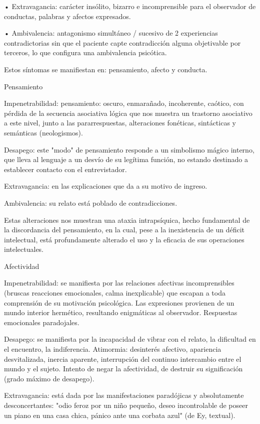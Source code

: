 \documentclass{scrbook}
\begin{document}
• Extravagancia: carácter insólito, bizarro e incomprensible para el observador de conductas, palabras y afectos expresados.

• Ambivalencia: antagonismo simultáneo / sucesivo de 2 experiencias contradictorias sin que el paciente capte contradicción alguna objetivable por terceros, lo que configura una ambivalencia psicótica.

Estos síntomas se manifiestan en: pensamiento, afecto y conducta.

Pensamiento

Impenetrabilidad: pensamiento: oscuro, enmarañado, incoherente, caótico, con pérdida de la secuencia asociativa lógica que nos muestra un trastorno asociativo a este nivel, junto a las pararrespuestas, alteraciones fonéticas, sintácticas y semánticas (neologismos).

Desapego: este "modo" de pensamiento responde a un simbolismo mágico interno, que lleva al lenguaje a un desvío de su legítima función, no estando destinado a establecer contacto con el entrevistador.

Extravagancia: en las explicaciones que da a su motivo de ingreso.

Ambivalencia: su relato está poblado de contradicciones.

Estas alteraciones nos muestran una ataxia intrapsíquica, hecho fundamental de la discordancia del pensamiento, en la cual, pese a la inexistencia de un déficit intelectual, está profundamente alterado el uso y la eficacia de sus operaciones intelectuales.

Afectividad

Impenetrabilidad: se manifiesta por las relaciones afectivas incomprensibles (bruscas reacciones emocionales, calma inexplicable) que escapan a toda comprensión de su motivación psicológica. Las expresiones provienen de un mundo interior hermético, resultando enigmáticas al observador. Respuestas emocionales paradojales.

Desapego: se manifiesta por la incapacidad de vibrar con el relato, la dificultad en el encuentro, la indiferencia. Atimormia: desinterés afectivo, apariencia desvitalizada, inercia aparente, interrupción del continuo intercambio entre el mundo y el sujeto. Intento de negar la afectividad, de destruir su significación (grado máximo de desapego).

Extravagancia: está dada por las manifestaciones paradójicas y absolutamente desconcertantes: "odio feroz por un niño pequeño, deseo incontrolable de poseer un piano en una casa chica, pánico ante una corbata azul" (de Ey, textual).
\end{document}
